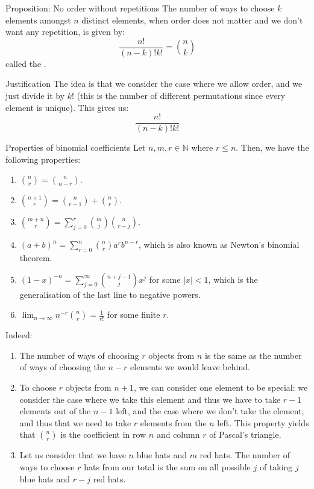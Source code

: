 \documentclass[a4paper]{article}
\begin{document}
\begin{parag}{Proposition: No order without repetitions}
    The number of ways to choose $k$ elements amongst $n$ distinct elements, when order does not matter and we don't want any repetition, is given by:
    \[\frac{n!}{\left(n-k\right)!k!} = \binom{n}{k}\]
    called the .

    \begin{subparag}{Justification}
        The idea is that we consider the case where we allow order, and we just divide it by $k!$ (this is the number of different permutations since every element is unique). This gives us: 
        \[\frac{n!}{\left(n-k\right)!k!}\]
    \end{subparag}
\end{parag}

\begin{parag}{Properties of binomial coefficients}
    Let $n, m, r\in \mathbb{N}$ where $r \leq n$. Then, we have the following properties:
    \begin{enumerate}
        \item $\displaystyle \binom{n}{r} = \binom{n}{n-r}$.
        \item $\displaystyle \binom{n + 1}{r} = \binom{n}{r-1} + \binom{n}{r}$.
        \item $\displaystyle \binom{m+n}{r} = \sum_{j=0}^{r} \binom{m}{j} \binom{n}{r-j}$.
        \item $\displaystyle \left(a+b\right)^n = \sum_{r=0}^{n} \binom{n}{r} a^{r} b^{n-r}$, which is also known as Newton's binomial theorem.
        \item $\displaystyle \left(1-x\right)^{-n} = \sum_{j=0}^{\infty} \binom{n+j-1}{j} x^j$ for some $\left|x\right| < 1$, which is the generalisation of the last line to negative powers.
        \item $\displaystyle \lim_{n \to \infty} n^{-r} \binom{n}{r} = \frac{1}{r!}$ for some finite $r$.
    \end{enumerate}

    Indeed:
    \begin{enumerate}
        \item The number of ways of choosing $r$ objects from $n$ is the same as the number of ways of choosing the $n-r$ elements we would leave behind.
        \item To choose $r$ objects from $n+1$, we can consider one element to be special: we consider the case where we take this element and thus we have to take $r-1$ elements out of the $n-1$ left, and the case where we don't take the element, and thus that we need to take $r$ elements from the $n$ left. This property yields that $\binom{n}{r}$ is the coefficient in row $n$ and column $r$ of Pascal's triangle.
        \item Let us consider that we have $n$ blue hats and $m$ red hats. The number of ways to choose $r$ hats from our total is the sum on all possible $j$ of taking $j$ blue hats and $r -j$ red hats.
    \end{enumerate}
    

\end{parag}
\end{document}
